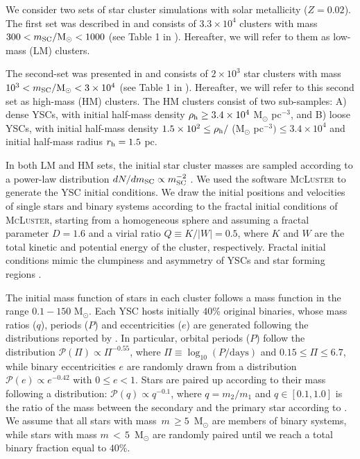 \documentclass[fleqn,usenatbib]{mnras}
\newcommand{\Ms}{M$_\odot$}
\begin{document}
 
We consider two sets of star cluster simulations with solar metallicity ($Z=0.02$). The first set was described in \cite{Rastello20} and consists of $3.3\times{}10^4$ clusters with mass  $300 <m_{\rm SC}/{\rm M}_\odot{}< 1000$ (see Table 1 in \citealt{Rastello20}). Hereafter, we will refer to them as low-mass (LM) clusters. 

The second-set was presented in \cite{dicarlo20} and consists of $2\times{}10^3$ star clusters with mass $10^{3} <m_{\rm SC}/{\rm M}_\odot{}< 3\times 10^{4}$ (see Table 1 in \citealt{dicarlo20}). Hereafter, we will refer to this second set as high-mass (HM) clusters. The HM clusters consist of two sub-samples: A) dense YSCs, with initial half-mass density $\rho_{\rm h}\ge{}3.4\times10^4$ M$_\odot$ pc$^{-3}$, and B) loose YSCs, 
 with initial half-mass density $1.5\times10^2 \le{} \rho_{\rm h}/$ (M$_\odot$ pc$^{-3}) \le{}3.4\times10^4$ and initial half-mass radius $r_{\rm h}=1.5$ pc. 

 In both LM and HM sets, the initial star cluster masses are sampled according to a power-law distribution $dN/dm_{\rm SC}\propto m_{\rm SC}^{-2}$ \citep{lada2003}. We used the software 
\textsc{McLuster} \citep{Kupper11} to generate the YSC initial conditions. 
We draw the initial positions and velocities of single stars and binary systems according to the fractal initial conditions of \textsc{McLuster}, starting from a homogeneous sphere and assuming a fractal parameter $D=1.6$ and a virial ratio $Q\equiv{K/|W|}=0.5$, where $K$ and $W$ are the total kinetic and potential energy of the cluster, respectively.  Fractal initial conditions mimic the clumpiness and asymmetry of YSCs and star forming regions \citep{ballone2020,ballone2021,torniamenti2021}. 

The initial mass function of stars in each cluster follows a \cite{kroupa2001} mass function in the range $0.1-150$ \Ms. 
Each YSC hosts initially $40$\% original binaries, whose mass ratios ($q$), periods ($P$) and eccentricities ($e$) are generated following the distributions reported by \cite{sana12}. In particular, orbital periods ($P$) follow the distribution
$\mathcal{P}(\Pi)\propto{}\Pi^{-0.55}$, where $\Pi\equiv{}\log_{10}(P/\mathrm{days})$
and $0.15\leq{}\Pi\leq{}6.7$, while binary eccentricities $e$
are randomly drawn from a distribution $\mathcal{P}(e)\propto{}e^{-0.42}$ with
$0\leq{}e<1$. Stars are paired up according to their mass following a distribution:
$\mathcal{P}(q)\propto{}q^{-0.1}$, where $q=m_2/m_1$ and $q \in [0.1,1.0]$ is the ratio of the mass between
the secondary and the primary star according to \cite{sana12}.
We assume that all stars with mass $\,m\,\ge{}5$~\Ms{} are members of binary systems, while stars with mass
$m\,<\,5$~\Ms{} are randomly paired until we reach a total binary fraction equal to $40$\%. 
\end{document}
